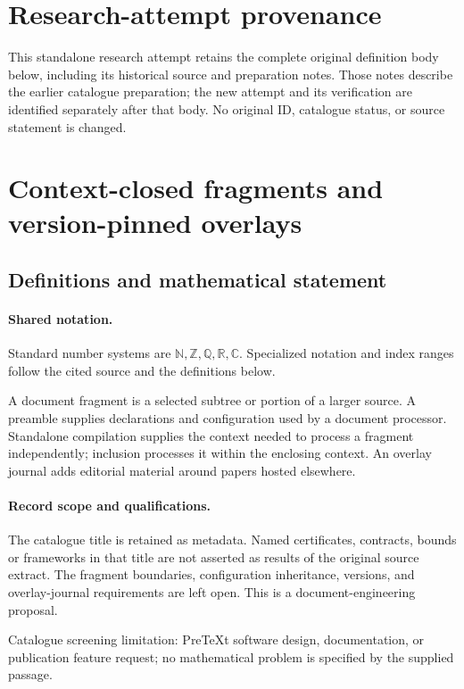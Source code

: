 \documentclass[11pt]{article}
\begin{document}
\section*{Research-attempt provenance}
This standalone research attempt retains the complete original definition body below,
including its historical source and preparation notes. Those notes describe the
earlier catalogue preparation; the new attempt and its verification are identified
separately after that body. No original ID, catalogue status, or source statement is changed.

\section{Context-closed fragments and version-pinned overlays}\label{statement}

\subsection{Definitions and mathematical statement}

\paragraph{Shared notation.}Standard number systems are $\mathbb N,\mathbb Z,\mathbb Q,\mathbb R,\mathbb C$. Specialized notation and index ranges follow the cited source and the definitions below.


A document fragment is a selected subtree or portion of a larger source. A preamble supplies declarations and configuration used by a document processor. Standalone compilation supplies the context needed to process a fragment independently; inclusion processes it within the enclosing context. An overlay journal adds editorial material around papers hosted elsewhere.
\paragraph{Record scope and qualifications.}
The catalogue title is retained as metadata. Named certificates, contracts, bounds or frameworks in that title are not asserted as results of the original source extract.
The fragment boundaries, configuration inheritance, versions, and overlay-journal requirements are left open. This is a document-engineering proposal.

Catalogue screening limitation: PreTeXt software design, documentation, or publication feature request; no mathematical problem is specified by the supplied passage.
\end{document}
